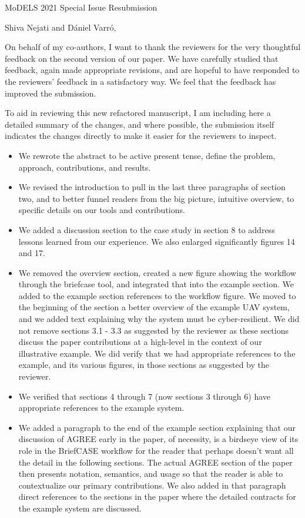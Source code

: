 \documentclass[10pt]{byu-cs}
\begin{document}
\pagestyle{headings}

\signature{Eric G Mercer\\
           Associate Professor}

\begin{letter}{MoDELS 2021 Special Issue Resubmission}

\date{\today}

\opening{Shiva Nejati and D\'{a}niel Varr\'{o},}

On behalf of my co-authors, I want to thank the reviewers for the very thoughtful feedback on the second version of our paper.
We have carefully studied that feedback, again made appropriate revisions, and are hopeful to have responded to the reviewers' feedback in a satisfactory way.
We feel that the feedback has improved the submission.

To aid in reviewing this new refactored manuscript, I am including here a detailed summary of the changes, and where possible, the submission itself indicates the changes directly to make it easier for the reviewers to inspect.
\begin{itemize}
  \item We rewrote the abstract to be active present tense, define the problem, approach, contributions, and results.
  \item We revised the introduction to pull in the last three paragraphs of section two, and to better funnel readers from the big picture, intuitive overview, to specific details on our tools and contributions. 
  \item We added a discussion section to the case study in section 8 to address lessons learned from our experience. We also enlarged significantly figures 14 and 17.
  \item We removed the overview section, created a new figure showing the workflow through the briefcase tool, and integrated that into the example section. We added to the example section references to the workflow figure. We moved to the beginning of the section a better overview of the example UAV system, and we added text explaining why the system must be cyber-resilient. We did not remove sections 3.1 - 3.3 as suggested by the reviewer as these sections discuss the paper contributions at a high-level in the context of our illustrative example. We did verify that we had appropriate references to the example, and its various figures, in those sections as suggested by the reviewer.
  \item We verified that sections 4 through 7 (now sections 3 through 6) have appropriate references to the example system.
  \item We added a paragraph to the end of the example section explaining that our discussion of AGREE early in the paper, of necessity, is a birdseye view of its role in the BriefCASE workflow for the reader that perhaps doesn't want all the detail in the following sections. The actual AGREE section of the paper then presents notation, semantics, and usage so that the reader is able to contextualize our primary contributions. We also added in that paragraph direct references to the sections in the paper where the detailed contracts for the example system are discussed. 
\end{itemize}


\end{letter}
\end{document}
